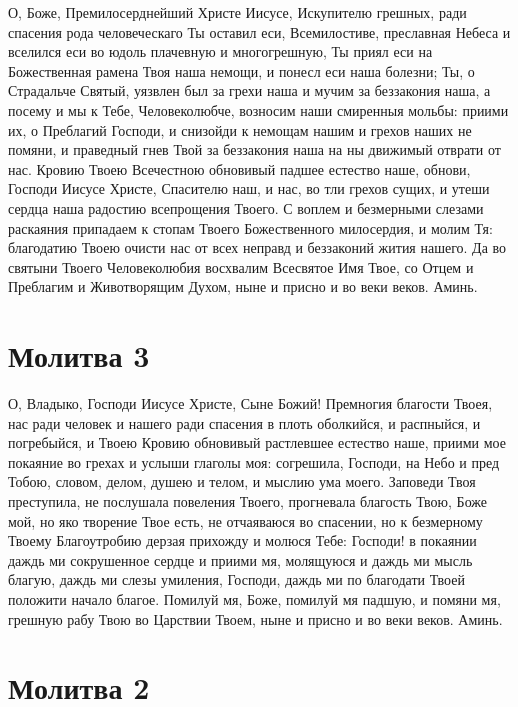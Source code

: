 О, Боже, Премилосерднейший Христе Иисусе, Искупителю грешных, ради спасения рода человеческаго Ты оставил еси, Всемилостиве, преславная Небеса и вселился еси во юдоль плачевную и многогрешную, Ты приял еси на Божественная рамена Твоя наша немощи, и понесл еси наша болезни; Ты, о Страдальче Святый, уязвлен был за грехи наша и мучим за беззакония наша, а посему и мы к Тебе, Человеколюбче, возносим наши смиренныя мольбы: приими их, о Преблагий Господи, и снизойди к немощам нашим и грехов наших не помяни, и праведный гнев Твой за беззакония наша на ны движимый отврати от нас. Кровию Твоею Всечестною обновивый падшее естество наше, обнови, Господи Иисусе Христе, Спасителю наш, и нас, во тли грехов сущих, и утеши сердца наша радостию всепрощения Твоего. С воплем и безмерными слезами раскаяния припадаем к стопам Твоего Божественного милосердия, и молим Тя: благодатию Твоею очисти нас от всех неправд и беззаконий жития нашего. Да во святыни Твоего Человеколюбия восхвалим Всесвятое Имя Твое, со Отцем и Преблагим и Животворящим Духом, ныне и присно и во веки веков. Аминь.


\section{Молитва 3}
 


О, Владыко, Господи Иисусе Христе, Сыне Божий! Премногия благости Твоея, нас ради человек и нашего ради спасения в плоть оболкийся, и распныйся, и погребыйся, и Твоею Кровию обновивый растлевшее естество наше, приими мое покаяние во грехах и услыши глаголы моя: согрешила, Господи, на Небо и пред Тобою, словом, делом, душею и телом, и мыслию ума моего. Заповеди Твоя преступила, не послушала повеления Твоего, прогневала благость Твою, Боже мой, но яко творение Твое есть, не отчаяваюся во спасении, но к безмерному Твоему Благоутробию дерзая прихожду и молюся Тебе: Господи! в покаянии даждь ми сокрушенное сердце и приими мя, молящуюся и даждь ми мысль благую, даждь ми слезы умиления, Господи, даждь ми по благодати Твоей положити начало благое. Помилуй мя, Боже, помилуй мя падшую, и помяни мя, грешную рабу Твою во Царствии Твоем, ныне и присно и во веки веков. Аминь.


\section{Молитва 2}
 


